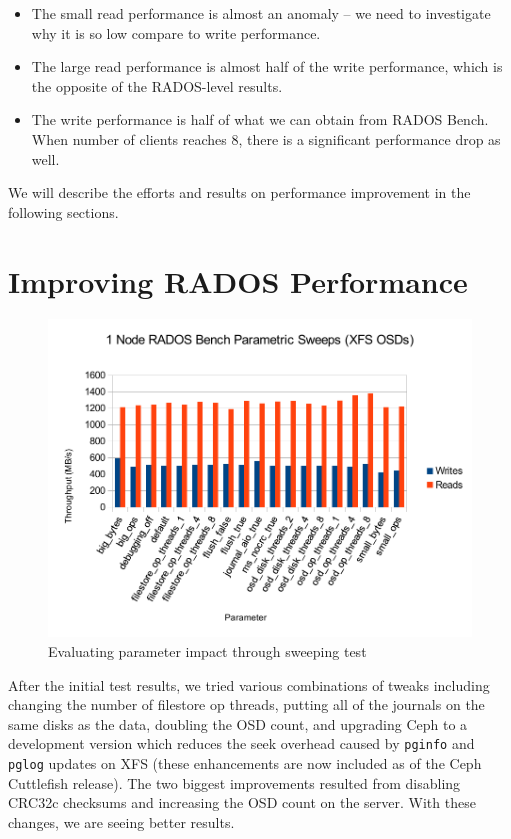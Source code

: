 \documentclass{article}
\begin{document}
\begin{itemize}
  \item The small read performance is almost an anomaly -- we need to
  investigate why it is so low compare to write performance.
  \item The large read performance is almost half of the write performance,
  which is the opposite of the RADOS-level results. 
  \item The write performance is half of what we can obtain from
  RADOS Bench. When number of clients reaches 8, there is a significant
  performance drop as well. 
\end{itemize}



We will describe the efforts and results on performance improvement in the
following sections.

\section{Improving RADOS Performance}

\begin{figure}[h]
\centering
\includegraphics[width=5in]{parametric}
\caption{Evaluating parameter impact through sweeping test}
\label{fig:parametric}
\end{figure}


After the initial test results, we tried various combinations of tweaks
including changing the number of filestore op threads, putting all
of the journals on the same disks as the data, doubling the OSD count, and
upgrading Ceph to a development version which reduces the seek overhead caused
by \texttt{pginfo} and \texttt{pglog} updates on XFS (these enhancements are
now included as of the Ceph Cuttlefish release).  The two biggest improvements
resulted from disabling CRC32c checksums and increasing the OSD count on the
server.  With these changes, we are seeing better results.
\end{document}
